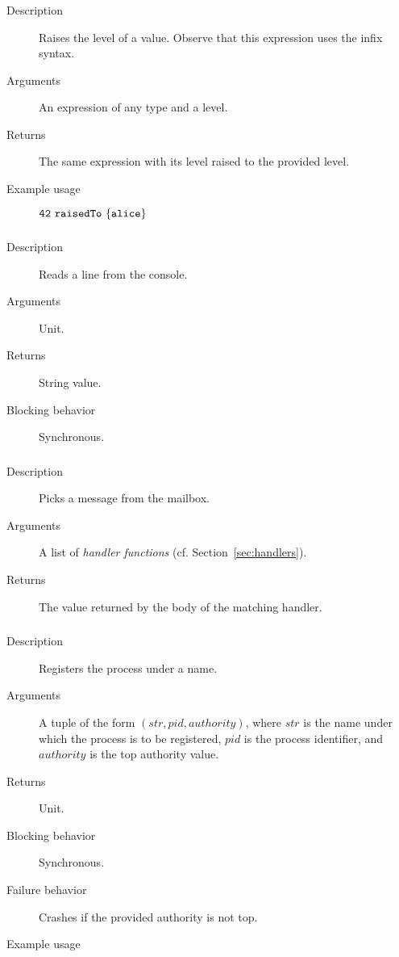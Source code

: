\subsubsection{}
\begin{description}
    \item [Description] Raises the level of a value. Observe that this expression uses the infix syntax.
    \item [Arguments] An expression of any type and a level.
    \item [Returns] The same expression with its level raised to the provided level.
    \item [Example usage] ${\mathtt{42\ raisedTo\ \{alice\}}}$
\end{description}

\subsubsection{}
\begin{description}
\item[Description] Reads a  line from the console.
\item[Arguments] Unit.
\item[Returns] String value.
\item[Blocking behavior] Synchronous.
\end{description}



\subsubsection{}
\begin{description}
    \item [Description] Picks a message from the mailbox.
    \item [Arguments] A list of \emph{handler functions} (cf. Section~\ref{sec:handlers}).
    \item [Returns] The value returned by the body of the matching handler.
\end{description}

\subsubsection{}
\begin{description}
    \item [Description] Registers the process under a name.
    \item [Arguments] A tuple of the form $(\mathit{str}, \mathit{pid}, \mathit{authority})$, where $\mathit{str}$ is the name under
which the process is to be registered, $\mathit{pid}$ is the process identifier, and 
$\mathit{authority}$ is the top authority value.
    \item [Returns] Unit.
    \item [Blocking behavior] Synchronous. 
    \item [Failure behavior] Crashes if the provided authority is not top.
    \item [Example usage]
\end{description}



